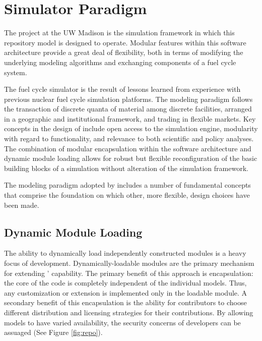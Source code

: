 \section{\Cyclus Simulator Paradigm }

The \Cyclus project \cite{wilson_cyclus:_2012} at the \gls{UW} Madison is the 
simulation framework in which this repository model is designed to 
operate.  Modular features within this software architecture provide a 
great deal of flexibility, both in terms of modifying the underlying 
modeling algorithms and exchanging components of a fuel cycle system.

The \Cyclus fuel cycle simulator is the  result of lessons learned 
from experience with previous nuclear fuel cycle simulation platforms.  
The modeling paradigm follows the transaction of discrete quanta of 
material among discrete facilities, arranged in a geographic and 
institutional framework, and trading in
flexible markets. Key concepts in the design of \Cyclus include open
access to the simulation engine, modularity with regard to
functionality, and relevance to both scientific and policy
analyses. The combination of modular encapsulation within the
software architecture and dynamic module loading allows for robust but 
flexible reconfiguration of the basic building blocks of a simulation 
without alteration of the simulation framework.  

The modeling paradigm adopted by \Cyclus includes a number of
fundamental concepts that comprise the foundation on which other, more
flexible, design choices have been made. 

\subsection{Dynamic Module Loading}

The ability to dynamically load independently constructed modules is a
heavy focus of \Cyclus development. Dynamically-loadable modules are
the primary mechanism for extending \Cyclus' capability. The primary
benefit of this approach is encapsulation: the core of the code is
completely independent of the individual models. Thus, any
customization or extension is implemented only in the loadable
module. A secondary benefit of this encapsulation is the ability for
contributors to choose different distribution and licensing strategies
for their contributions. By allowing models to have varied
availability, the security concerns of developers can be
assuaged (See Figure \ref{fig:repo}). 

